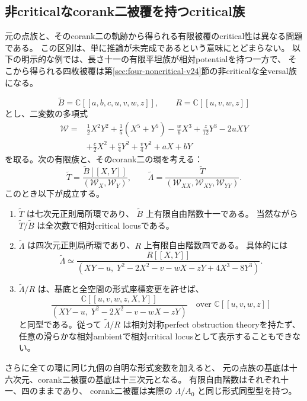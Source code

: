 \subsection{非criticalなcorank二被覆を持つcritical族}
\label{subsec:critical-source-noncritical-corank-v25}

元の点族と、そのcorank二の軌跡から得られる有限被覆のcritical性は異なる問題である。
この区別は、単に推論が未完成であるという意味にとどまらない。
以下の明示的な例では、長さ十一の有限平坦族が相対potentialを持つ一方で、
そこから得られる四枚被覆は第\ref{sec:four-noncritical-v24}節の非criticalな全versal族になる。

\begin{proposition}[critical族の中の非criticalな四枚被覆]
\label{prop:critical-source-noncritical-corank-v25}
\[
 \widetilde B=\mathbb C[[a,b,c,u,v,w,z]],\qquad
 R=\mathbb C[[u,v,w,z]]
\]
とし、二変数の多項式
\begin{align}
 \mathcal W={}&\frac12X^2Y^2+\frac15(X^5+Y^5)
 -\frac w6X^3+\frac z{12}Y^3-2uXY\nonumber\\
 &+\frac c2X^2+\frac c4Y^2+\frac v4Y^2+aX+bY
 \label{eq:critical-source-potential-v25}
\end{align}
を取る。次の有限族と、そのcorank二の環を考える：
\[
 \widetilde T=
 \frac{\widetilde B[[X,Y]]}{(\mathcal W_X,\mathcal W_Y)},\qquad
 \widetilde\Lambda=
 \frac{\widetilde T}{(\mathcal W_{XX},\mathcal W_{XY},\mathcal W_{YY})}.
\]
このとき以下が成立する。
\begin{enumerate}
\item $\widetilde T$ は七次元正則局所環であり、
$\widetilde B$ 上有限自由階数十一である。
当然ながら $\widetilde T/\widetilde B$ は全次数で相対critical locusである。
\item $\widetilde\Lambda$ は四次元正則局所環であり、$R$ 上有限自由階数四である。
具体的には
\begin{equation}\label{eq:countermodel-four-cover-v25}
 \widetilde\Lambda\simeq
 \frac{R[[X,Y]]}
 {(XY-u,\;Y^2-2X^2-v-wX-zY+4X^3-8Y^3)}.
\end{equation}
\item $\widetilde\Lambda/R$ は、基底と全空間の形式座標変更を許せば、
\[
 \frac{\mathbb C[[u,v,w,z,X,Y]]}
 {(XY-u,\;Y^2-2X^2-v-wX-zY)}
 \quad\text{over }\mathbb C[[u,v,w,z]]
\]
と同型である。従って $\widetilde\Lambda/R$ は相対対称perfect obstruction theoryを持たず、
任意の滑らかな相対ambientで相対critical locusとして表示することもできない。
\end{enumerate}
さらに全ての環に同じ九個の自明な形式変数を加えると、
元の点族の基底は十六次元、corank二被覆の基底は十三次元となる。
有限自由階数はそれぞれ十一、四のままであり、
corank二被覆は実際の $\Lambda/A_0$ と同じ形式同型型を持つ。
\end{proposition}

